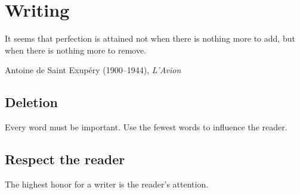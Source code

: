 \chapter{Writing}

\epigraph{It seems that perfection is attained not when there is nothing more to add, but when there is nothing more to remove.}{Antoine de Saint Exup\'ery (1900--1944), \emph{L'Avion}}

\section{Deletion}

Every word must be important.
Use the fewest words to influence the reader.

\section{Respect the reader}

The highest honor for a writer is the reader's attention.
